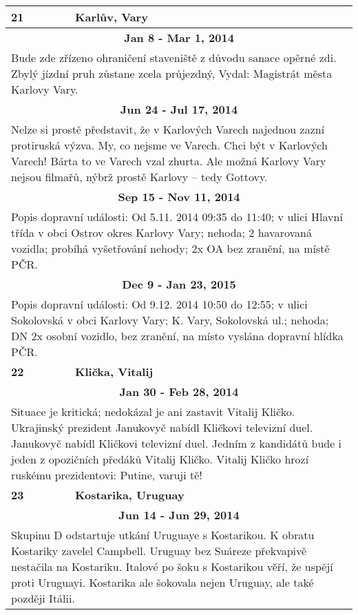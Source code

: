 \begin{tabularx}{\linewidth}{l l}
\bf 21 & \bf Karlův, Vary \\ \midrule
\multicolumn{2}{c}{\bf Jan 8 - Mar 1, 2014} \\
\multicolumn{2}{p{\linewidth}}{Bude zde zřízeno ohraničení staveniště z důvodu sanace opěrné zdi. Zbylý jízdní pruh zůstane zcela průjezdný, Vydal: Magistrát města Karlovy Vary.} \\ \midrule
\multicolumn{2}{c}{\bf Jun 24 - Jul 17, 2014} \\
\multicolumn{2}{p{\linewidth}}{Nelze si prostě představit, že v Karlových Varech najednou zazní protiruská výzva. My, co nejsme ve Varech. Chci být v Karlových Varech! Bárta to ve Varech vzal zhurta. Ale možná Karlovy Vary nejsou filmařů, nýbrž prostě Karlovy – tedy Gottovy.} \\ \midrule
\multicolumn{2}{c}{\bf Sep 15 - Nov 11, 2014} \\
\multicolumn{2}{p{\linewidth}}{Popis dopravní události: Od 5.11. 2014 09:35 do 11:40; v ulici Hlavní třída v obci Ostrov okres Karlovy Vary; nehoda; 2 havarovaná vozidla; probíhá vyšetřování nehody; 2x OA bez zranění, na místě PČR.} \\ \midrule
\multicolumn{2}{c}{\bf Dec 9 - Jan 23, 2015} \\
\multicolumn{2}{p{\linewidth}}{Popis dopravní události: Od 9.12. 2014 10:50 do 12:55; v ulici Sokolovská v obci Karlovy Vary; K. Vary, Sokolovská ul.; nehoda; DN 2x osobní vozidlo, bez zranění, na místo vyslána dopravní hlídka PČR.} \\ \midrule[1.5pt]

\bf 22 & \bf Klička, Vitalij \\ \midrule
\multicolumn{2}{c}{\bf Jan 30 - Feb 28, 2014} \\
\multicolumn{2}{p{\linewidth}}{Situace je kritická; nedokázal je ani zastavit Vitalij Kličko. Ukrajinský prezident Janukovyč nabídl Kličkovi televizní duel. Janukovyč nabídl Kličkovi televizní duel. Jedním z kandidátů bude i jeden z opozičních předáků Vitalij Kličko. Vitalij Kličko hrozí ruskému prezidentovi: Putine, varuji tě!} \\ \midrule[1.5pt]

\bf 23 & \bf Kostarika, Uruguay \\ \midrule
\multicolumn{2}{c}{\bf Jun 14 - Jun 29, 2014} \\
\multicolumn{2}{p{\linewidth}}{Skupinu D odstartuje utkání Uruguaye s Kostarikou. K obratu Kostariky zavelel Campbell. Uruguay bez Suáreze překvapivě nestačila na Kostariku. Italové po šoku s Kostarikou věří, že uspějí proti Uruguayi. Kostarika ale šokovala nejen Uruguay, ale také později Itálii.} \\ \midrule[1.5pt]


\end{tabularx}
